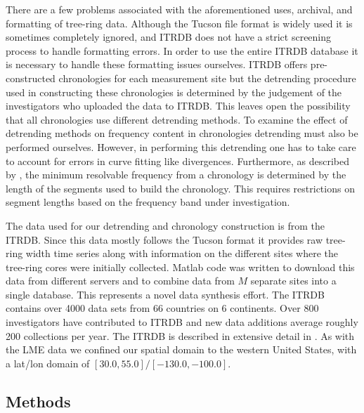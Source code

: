 \documentclass[phd,tocprelim]{cornell}
\begin{document}
\par
There are a few problems associated with the aforementioned uses, 
archival, and formatting of tree-ring data. Although the Tucson file 
format is widely used it is sometimes completely ignored, and ITRDB 
does not have a strict screening process to handle formatting errors. 
In order to use the entire ITRDB database it is necessary to handle 
these formatting issues ourselves. ITRDB offers pre-constructed 
chronologies for each measurement site but the detrending procedure 
used in constructing these chronologies is determined by the judgement 
of the investigators who uploaded the data to ITRDB. This leaves 
open the possibility that all chronologies use different detrending methods. 
To examine the effect of detrending methods on frequency content in 
chronologies detrending must also be performed ourselves. However, 
in performing this detrending one has to take care to account for errors 
in curve fitting like divergences. Furthermore, as described by 
\cite{cook1995segment}, the minimum resolvable frequency from a 
chronology is determined by the length of the segments used to build 
the chronology. This requires restrictions on segment lengths based 
on the frequency band under investigation. 

\par
The data used for our detrending and chronology construction is 
from the ITRDB. Since this data mostly follows the Tucson format it 
provides raw tree-ring width time series along with information on 
the different sites where the tree-ring cores were initially collected. 
Matlab code was written to download this data from different servers 
and to combine data from $M$ separate sites into a single database. 
This represents a novel data synthesis effort. The ITRDB contains 
over 4000 data sets from 66 countries on 6 continents. Over 800 
investigators have contributed to ITRDB and new data additions average 
roughly 200 collections per year. The ITRDB is described in extensive 
detail in \cite{zhao2019itrdb}. As with the LME data we confined our 
spatial domain to the western United States, with a lat/lon domain 
of $[30.0,55.0]/[-130.0,-100.0]$.


\subsection{Methods}\label{methods:2}
\end{document}
